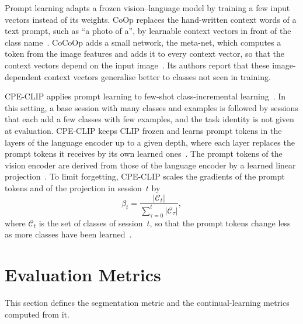 Prompt learning adapts a frozen vision--language model by training a few input vectors instead of its weights.
CoOp replaces the hand-written context words of a text prompt, such as ``a photo of a'', by learnable context vectors in front of the class name~\cite{zhou2022coop}.
CoCoOp adds a small network, the meta-net, which computes a token from the image features and adds it to every context vector, so that the context vectors depend on the input image~\cite[Secs.~3.3 and~4.1]{zhou2022cocoop}.
Its authors report that these image-dependent context vectors generalise better to classes not seen in training.

CPE-CLIP applies prompt learning to few-shot class-incremental learning~\cite[Secs.~1 and~3]{D_Alessandro_2023}.
In this setting, a base session with many classes and examples is followed by sessions that each add a few classes with few examples, and the task identity is not given at evaluation.
CPE-CLIP keeps CLIP frozen and learns prompt tokens in the layers of the language encoder up to a given depth, where each layer replaces the prompt tokens it receives by its own learned ones~\cite[Sec.~4, Eqs.~2--4]{D_Alessandro_2023}.
The prompt tokens of the vision encoder are derived from those of the language encoder by a learned linear projection~\cite[Sec.~4, Eqs.~6--8]{D_Alessandro_2023}.
To limit forgetting, CPE-CLIP scales the gradients of the prompt tokens and of the projection in session~$t$ by
\begin{equation}
\beta_t = \frac{|\mathcal{C}_t|}{\sum_{\tau=0}^{t} |\mathcal{C}_\tau|},
\label{eq:bg-cpe-scaling}
\end{equation}
where $\mathcal{C}_t$ is the set of classes of session~$t$, so that the prompt tokens change less as more classes have been learned~\cite[Sec.~4, Eqs.~11--13]{D_Alessandro_2023}.

\section{Evaluation Metrics}
\label{sec:bg-metrics}

This section defines the segmentation metric and the continual-learning metrics computed from it.

